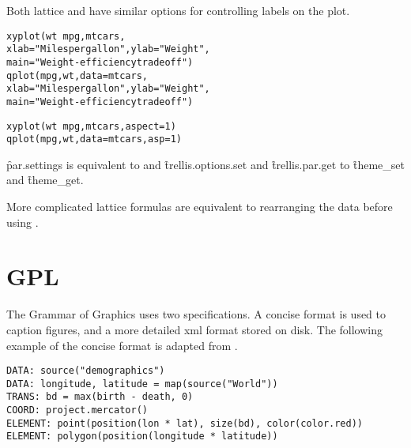 Both lattice and \ggplot have similar options for controlling labels on the plot.

\begin{alltt}
xyplot(wt ~ mpg, mtcars, 
  xlab = "Miles per gallon", ylab = "Weight", 
  main = "Weight-efficiency tradeoff")
qplot(mpg, wt, data = mtcars, 
  xlab = "Miles per gallon", ylab = "Weight", 
  main = "Weight-efficiency tradeoff")

xyplot(wt ~ mpg, mtcars, aspect = 1) 
qplot(mpg, wt, data = mtcars, asp = 1)
\end{alltt}

\f{par.settings} is equivalent to  and \f{trellis.options.set} and \f{trellis.par.get} to \f{theme_set} and \f{theme_get}.


More complicated lattice formulas are equivalent to rearranging the data before using \ggplot.

% 
% 
% 
% 
% 
% 
% 

\section{GPL}
\label{sec:translate-gpl}

The Grammar of Graphics uses two specifications.  A concise format is used to caption figures, and a more detailed xml format stored on disk.  The following example of the concise format is adapted from \citet[][Figure 1.5, page 13]{wilkinson:2006}.

\begin{verbatim}
DATA: source("demographics")
DATA: longitude, latitude = map(source("World"))
TRANS: bd = max(birth - death, 0)
COORD: project.mercator()
ELEMENT: point(position(lon * lat), size(bd), color(color.red))
ELEMENT: polygon(position(longitude * latitude))
\end{verbatim}

